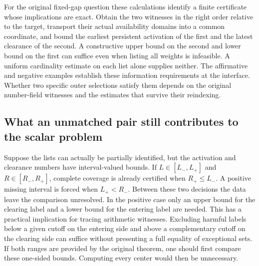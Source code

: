 \documentclass[12pt,letterpaper]{article}
\begin{document}
For the original fixed-gap question these calculations identify a finite certificate whose implications are exact. Obtain the two witnesses in the right order relative to the target, transport their actual availability domains into a common coordinate, and bound the earliest persistent activation of the first and the latest clearance of the second. A constructive upper bound on the second and lower bound on the first can suffice even when listing all weights is infeasible. A uniform cardinality estimate on each list alone supplies neither. The affirmative and negative examples establish these information requirements at the interface. Whether two specific outer selections satisfy them depends on the original number-field witnesses and the estimates that survive their reindexing.

\subsection{What an unmatched pair still contributes to the scalar problem}
Suppose the lists can actually be partially identified, but the activation and clearance numbers have interval-valued bounds. If \(L\in[L_-,L_+]\) and \(R\in[R_-,R_+]\), complete coverage is already certified when \(R_+\le L_-\). A positive missing interval is forced when \(L_+<R_-\). Between these two decisions the data leave the comparison unresolved. In the positive case only an upper bound for the clearing label and a lower bound for the entering label are needed. This has a practical implication for tracing arithmetic witnesses. Excluding harmful labels below a given cutoff on the entering side and above a complementary cutoff on the clearing side can suffice without presenting a full equality of exceptional sets. If both ranges are provided by the original theorem, one should first compare these one-sided bounds. Computing every center would then be unnecessary.
\end{document}
